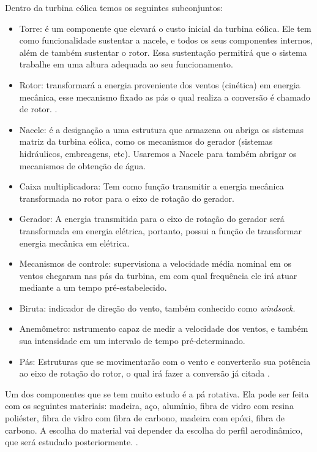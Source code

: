 Dentro da turbina eólica temos os seguintes subconjuntos: 
\begin{itemize}
\item Torre: é um componente que elevará o custo inicial da turbina eólica. Ele tem como funcionalidade sustentar a nacele,
  e todos os seus componentes internos, além de também sustentar o rotor. Essa sustentação permitirá que o sistema trabalhe em
  uma altura adequada ao seu funcionamento.

\item Rotor: transformará a energia proveniente dos ventos (cinética) em energia mecânica, esse mecanismo fixado as pás o qual
  realiza a conversão é chamado de rotor. \cite{rossiEtAl}.

\item Nacele: é a designação a uma estrutura que armazena ou abriga os sistemas matriz da turbina eólica, como os mecanismos do
  gerador (sistemas hidráulicos, embreagens, etc). Usaremos a Nacele para também abrigar os mecanismos de obtenção de água.

\item Caixa multiplicadora: Tem como função transmitir a energia mecânica transformada no rotor para o eixo de rotação do gerador.

\item Gerador: 	A energia transmitida para o eixo de rotação do gerador será transformada em energia elétrica, portanto,
  possui a função de transformar energia mecânica em elétrica.

\item Mecanismos de controle: supervisiona a velocidade média nominal em os ventos chegaram nas pás da turbina, em com qual
  frequência ele irá atuar mediante a um tempo pré-estabelecido.

\item Biruta: 	indicador de direção do vento, também conhecido como \textit{windsock}.

\item Anemômetro: nstrumento capaz de medir a velocidade dos ventos, e também sua intensidade em um intervalo de tempo
  pré-determinado.
  
\item Pás: Estruturas que se movimentarão com o vento e converterão sua potência ao eixo de rotação do rotor, 
  o qual irá fazer a conversão já citada \cite{rossiEtAl}.	 	

\end{itemize}

Um dos componentes que se tem muito estudo é a pá rotativa. Ela pode ser feita com os seguintes materiais: 
madeira, aço, alumínio, fibra de vidro com resina poliéster, fibra de vidro com fibra de carbono, madeira com epóxi,
fibra de carbono. A escolha do material vai depender da escolha do perfil aerodinâmico, que será estudado posteriormente.
\cite{portalEnergia}.

